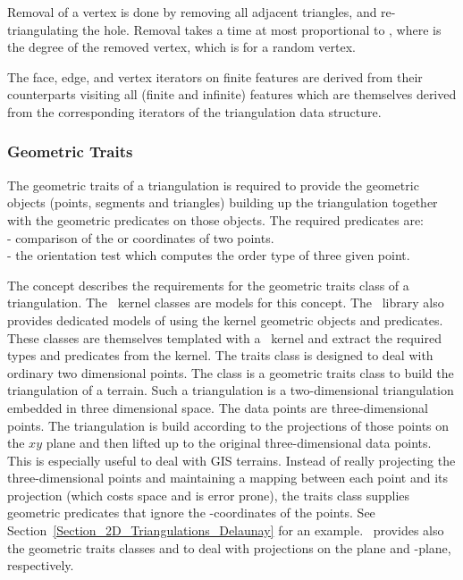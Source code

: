 Removal of a vertex is done by removing all adjacent triangles, and
re-triangulating the hole. Removal takes a time  at most proportional to
, where
  is the degree of the removed vertex,
which is  for a random vertex.

The face, edge, and vertex iterators on finite features
are derived from their counterparts visiting all (finite and infinite)
features which are themselves derived from the corresponding iterators
of the triangulation data structure.


\subsubsection{Geometric Traits\label{Subsubsection_2D_Triangulation_Basic_Geometric_Traits}}

The geometric traits of a triangulation 
 is required to provide
the geometric objects (points, segments and triangles)
building up the triangulation
together with the geometric predicates on those objects.
The required predicates are: \\
- comparison of the  or  coordinates of two points.\\
- the orientation test which computes 
  the order type of three given point.

The concept
  describes the requirements for the 
geometric traits class of a triangulation.
 The \cgal\  kernel classes 
are models for  this  concept.
The \cgal\  library also provides dedicated models
of  
using the kernel geometric objects and predicates.
These classes are themselves templated with a \cgal\  kernel
and extract the required types and predicates from the kernel.
The traits class 
is designed to deal with ordinary  two dimensional points.
The class  
is a geometric traits class to build the triangulation
of a terrain. Such a triangulation is a two-dimensional
triangulation embedded  in  three dimensional space.
The data points are three-dimensional points.
The triangulation is 
build according to  the projections of those points
on the $xy$ plane  and then lifted up to the original
three-dimensional data points.
This is especially useful
to deal with GIS terrains.
Instead of really projecting the  three-dimensional points and
maintaining a mapping between each point and its projection
 (which costs space and is error prone),
the traits class  supplies geometric predicates that ignore the
-coordinates of the points.
See Section~\ref{Section_2D_Triangulations_Delaunay} for an example.
\cgal\ provides also the geometric traits classes
 and
 to
deal with projections on the
  plane  and  -plane,
respectively.

